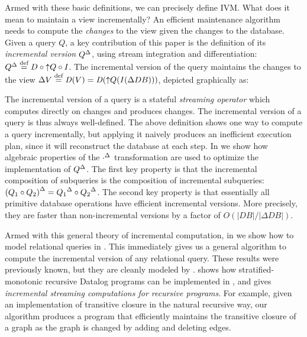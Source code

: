 Armed with these basic definitions, we can precisely define IVM.
What does it mean to maintain a view incrementally?  An
efficient maintenance algorithm needs to compute the \emph{changes} to
the view given the changes to the database. Given a query $Q$, a key
contribution of this paper is the definition of its \emph{incremental
  version} ${Q}^{\Delta}$, using stream integration and differentiation:
${Q}^{\Delta} \stackrel{\textrm{\scriptsize def}}{=} D \circ {\uparrow}Q \circ I$. The incremental version of
the query maintains the changes to the view $\Delta V \stackrel{\textrm{\scriptsize def}}{=} \mathit{D}(V) =
\mathit{D}({\uparrow}Q(\mathit{I}(\Delta DB)))$, depicted graphically as:

\begin{center}
\end{center}

The incremental version of a query is a stateful \emph{streaming
  operator} which computes directly on changes and produces changes.
The incremental version of a query is thus always well-defined.  The
above definition shows one way to compute a query incrementally, but
applying it naively produces an inefficient execution plan, since it
will reconstruct the database at each step.  In
 we show how algebraic properties of the
${\cdot}^{\Delta}$ transformation are used to optimize the implementation
of ${Q}^{\Delta}$. The first key property is that the incremental
composition of subqueries is the composition of incremental
subqueries: ${(Q_1 \circ Q_2)}^{\Delta} = {Q_1}^{\Delta} \circ {Q_2}^{\Delta}$.  The
second key property is that essentially all primitive database
operations have efficient incremental versions.  More precisely, they
are faster than non-incremental versions by a factor of
$O(|DB|/|\Delta DB|)$.

Armed with this general theory of incremental computation, in
 we show how to model relational queries in
\dbsp.  This immediately gives us a general algorithm to compute the
incremental version of any relational query.  These results were
previously known, but they are cleanly modeled by \dbsp.
 shows how stratified-monotonic recursive Datalog
programs can be implemented in \dbsp, and  gives
\emph{incremental streaming computations for recursive programs}. For
example, given an implementation of transitive closure in the natural
recursive way, our algorithm produces a program that efficiently
maintains the transitive closure of a graph as the graph is changed by
adding and deleting edges.

